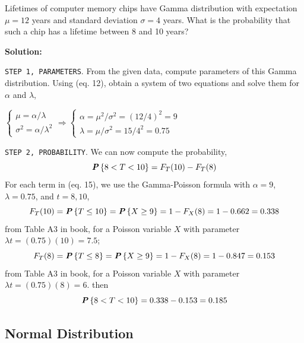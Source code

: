 \begin{example}{}
    Lifetimes of computer memory chips have Gamma distribution with expectation $\mu = 12$ years and standard deviation $\sigma = 4$ years. What is the probability that such a chip has a lifetime between 8 and 10 years?

    \textbf{Solution:} 
    
    \texttt{STEP 1, PARAMETERS}. From the given data, compute parameters of this Gamma distribution. Using (eq. 12), obtain a system of two equations and solve them for $\alpha$ and $\lambda$,
    \begin{center}
        $\begin{cases}
            \mu = \alpha/\lambda\\
            \sigma^2 = \alpha/\lambda^2
        \end{cases}
        \Rightarrow
        \begin{cases}
            \alpha = \mu^2/\sigma^2 = (12/4)^2 = 9\\
            \lambda = \mu/\sigma^2 = 15/4^2 = 0.75
        \end{cases}$
    \end{center}

    \texttt{STEP 2, PROBABILITY}. We can now compute the probability,
    \begin{equation}
        \textbf{\textit{P}}\left\{8 < T < 10\right\} = F_T(10) - F_T(8)
    \end{equation}
    For each term in (eq. 15), we use the Gamma-Poisson formula with $\alpha = 9$, $\lambda = 0.75$, and $t = 8, 10$,
    \begin{equation*}
        F_T(10) = \textbf{\textit{P}}\left\{T \leq 10\right\} = \textbf{\textit{P}}\left\{X \geq 9\right\} = 1 - F_X(8) = 1 - 0.662 = 0.338
    \end{equation*}
    from Table A3 in book, for a Poisson variable $X$ with parameter $\lambda t = (0.75)(10) = 7.5$;
    \begin{equation*}
        F_T(8) = \textbf{\textit{P}}\left\{T \leq 8\right\} = \textbf{\textit{P}}\left\{X \geq 9\right\} = 1 - F_X(8) = 1 - 0.847 = 0.153
    \end{equation*}
    from Table A3 in book, for a Poisson variable $X$ with parameter $\lambda t = (0.75)(8) = 6$. then
    \begin{equation*}
        \textbf{\textit{P}}\left\{8 < T < 10\right\} = 0.338 - 0.153 = 0.185
    \end{equation*}
\end{example}

\subsection{Normal Distribution}

